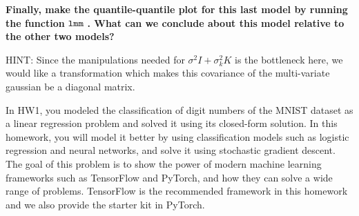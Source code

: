 \documentclass[preview]{standalone}
\begin{document}
\begin{Parts}
\textbf{Finally, make the quantile-quantile plot for this last model by running the function }$\verb|lmm|$ \textbf{. What can we conclude about this model relative to the other two models?}
	
	HINT: Since the manipulations needed for $\sigma^2I + \sigma_k^2K$ is the bottleneck here, we would like a transformation which makes this covariance of the multi-variate gaussian be a diagonal matrix.
	
	
	
	
	
	
	
%	
	
%	
	
\end{Parts} 

In HW1, you modeled the classification of digit numbers of the MNIST dataset as
a linear regression problem and solved it using its closed-form solution.  In
this homework, you will model it better by using classification models such as
logistic regression and neural networks, and solve it using stochastic gradient
descent.  The goal of this problem is to show the power of modern machine
learning frameworks such as TensorFlow and PyTorch, and how they can solve a
wide range of problems.  TensorFlow is the recommended framework in this
homework and we also provide the starter kit in PyTorch.
\end{document}
